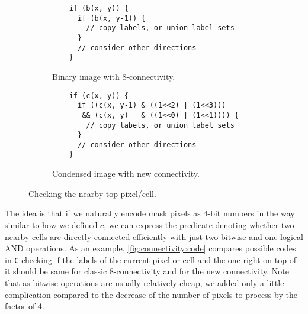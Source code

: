 \documentclass[hidelinks]{llncs}
\newcommand{\texten}[1]{#1}
\newcommand{\textru}[1]{}
\renewcommand{\C}{\texttt{C} \xspace}
\begin{document}
\begin{figure}
  \centering
  \begin{subfigure}[t]{0.475\linewidth}
    \centering
    \begin{lstlisting}
    if (b(x, y)) {
      if (b(x, y-1)) {
        // copy labels, or union label sets
      }
      // consider other directions
    }
    \end{lstlisting}
    \caption{Binary image with 8-connectivity.}
  \end{subfigure}
  \quad
  \begin{subfigure}[t]{0.475\linewidth}
    \centering
    \begin{lstlisting}
    if (c(x, y)) {
      if ((c(x, y-1) & ((1<<2) | (1<<3)))
       && (c(x, y)   & ((1<<0) | (1<<1)))) {
        // copy labels, or union label sets
      }
      // consider other directions
    }
    \end{lstlisting}
    \caption{Condensed image with new connectivity.}
  \end{subfigure}
  \caption{Checking the nearby top pixel/cell.}
  \label{fig:connectivity:code}
\end{figure}

\texten{
The idea is that if we naturally encode mask pixels as 4-bit numbers in the
way similar to how we defined $c$, we can express the predicate denoting whether
two nearby cells
are directly connected efficiently with just two bitwise and one logical AND
operations.
As an example, \autoref{fig:connectivity:code} compares possible codes in \C
checking if the labels of the current pixel or cell and the one right on top of
it should be same for classic 8-connectivity and for the new connectivity. Note
that as bitwise operations are usually relatively cheap, we added only a little
complication compared to the decrease of the number of pixels to process by the
factor of 4.
}\textru{
Идея в том, что с нашим естественным способом кодирования конфигурации клеток в
4-разрядных числах, предикат, определяющий связность двух соседных клеток,
может быть представлен всего двумя битовыми и одной логической операцией И.
В качестве примера, на \autoref{fig:connectivity:code} приведено сравнение
возможных фрагментов программы на языке \C\hspace{-0.8em}, проверяющих, связан
ли текущий пиксель (или клетка) с пикселем (или клеткой) над ним (ней).
Стоит отметить, что хотя конструкция усложнилась, битовые операции как правило
очень эффективны, и это усложнение, скорее всего, незначительно по сравнению с
уменьшением количества рассматриваемых позиций в 4 раза.
}
\end{document}
